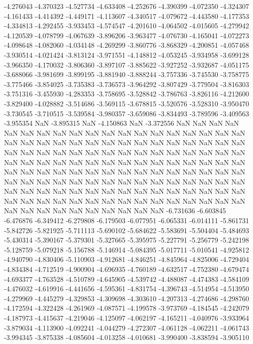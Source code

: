 -4.276043
-4.370323
-4.527734
-4.633408
-4.252676
-4.390399
-4.072350
-4.324307
-4.161433
-4.414392
-4.449171
-4.113607
-4.340517
-4.079672
-4.443580
-4.177353
-4.334813
-4.292455
-3.933453
-4.574547
-4.201610
-4.064502
-4.015605
-4.279942
-4.120539
-4.078799
-4.067639
-3.896206
-3.963477
-4.076730
-4.165041
-4.072273
-4.098648
-4.082060
-4.034148
-4.269299
-3.860776
-3.868329
-4.200851
-4.057468
-3.930514
-4.021424
-3.813124
-3.971551
-4.148812
-4.053245
-3.934958
-3.699128
-3.966350
-4.170032
-3.806360
-3.897107
-3.885622
-3.927252
-3.932687
-4.051175
-3.688066
-3.981699
-3.899195
-3.881940
-3.888244
-3.757336
-3.745530
-3.758775
-3.775466
-3.854025
-3.735383
-3.736573
-3.964292
-3.807429
-3.779504
-3.816303
-3.751316
-3.455930
-4.283353
-3.758695
-3.528842
-3.786763
-3.826116
-4.212600
-3.829400
-4.028882
-3.514686
-3.569115
-3.678815
-3.520576
-3.528310
-3.950470
-3.730545
-3.710515
-3.539584
-3.980357
-3.659086
-3.834493
-3.789596
-3.409563
-3.955354
NaN
-3.895315
NaN
-4.150863
NaN
-3.372556
NaN
NaN
NaN
NaN
NaN
NaN
NaN
NaN
NaN
NaN
NaN
NaN
NaN
NaN
NaN
NaN
NaN
NaN
NaN
NaN
NaN
NaN
NaN
NaN
NaN
NaN
NaN
NaN
NaN
NaN
NaN
NaN
NaN
NaN
NaN
NaN
NaN
NaN
NaN
NaN
NaN
NaN
NaN
NaN
NaN
NaN
NaN
NaN
NaN
NaN
NaN
NaN
NaN
NaN
NaN
NaN
NaN
NaN
NaN
NaN
NaN
NaN
NaN
NaN
NaN
NaN
NaN
NaN
NaN
NaN
NaN
NaN
NaN
NaN
NaN
NaN
NaN
NaN
NaN
NaN
NaN
NaN
NaN
NaN
NaN
NaN
NaN
NaN
NaN
NaN
NaN
NaN
NaN
NaN
NaN
NaN
NaN
NaN
NaN
NaN
NaN
NaN
NaN
NaN
NaN
NaN
NaN
NaN
NaN
NaN
NaN
NaN
NaN
NaN
NaN
NaN
NaN
NaN
NaN
NaN
NaN
NaN
NaN
NaN
NaN
NaN
NaN
NaN
NaN
NaN
NaN
NaN
NaN
NaN
-6.731636
-6.603845
-6.476876
-6.349412
-6.279808
-6.179503
-6.077951
-6.065331
-6.014111
-5.861731
-5.842726
-5.821925
-5.711113
-5.690102
-5.684622
-5.583691
-5.504404
-5.484693
-5.430314
-5.390167
-5.379301
-5.327665
-5.395975
-5.227791
-5.256779
-5.242198
-5.128759
-5.079218
-5.156788
-5.146914
-5.084395
-5.017711
-5.010541
-4.925812
-4.940790
-4.830406
-5.110903
-4.912681
-4.846251
-4.845964
-4.825006
-4.729404
-4.834384
-4.712519
-4.900904
-4.696935
-4.760189
-4.632517
-4.752380
-4.679474
-4.693377
-4.763528
-4.510789
-4.645905
-4.539742
-4.488087
-4.474383
-4.584109
-4.476032
-4.619916
-4.441656
-4.595361
-4.831754
-4.396743
-4.514954
-4.513950
-4.279969
-4.445279
-4.329853
-4.309698
-4.303610
-4.207313
-4.274686
-4.298760
-4.172594
-4.322428
-4.261969
-4.087571
-4.199578
-3.973769
-4.184545
-4.242079
-4.187973
-4.415637
-4.219046
-4.125097
-4.062197
-4.165211
-4.040976
-3.933964
-3.879034
-4.113900
-4.092241
-4.044279
-4.272307
-4.061128
-4.062211
-4.061743
-3.994345
-3.875338
-4.085604
-4.013258
-4.010681
-3.990400
-3.838594
-3.905110
